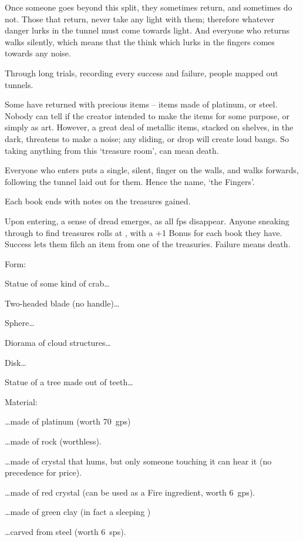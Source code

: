 \begin{multicols}{2}
\begin{exampletext}
  Once someone goes beyond this split, they sometimes return, and sometimes do not.
  Those that return, never take any light with them; therefore whatever danger lurks in the tunnel must come towards light.
  And everyone who returns walks silently, which means that the think which lurks in the fingers comes towards any noise.

  Through long trials, recording every success and failure, people mapped out tunnels.

  Some have returned with precious items -- items made of platinum, or steel.
  Nobody can tell if the creator intended to make the items for some purpose, or simply as art.
  However, a great deal of metallic items, stacked on shelves, in the dark, threatens to make a noise; any sliding, or drop will create loud bangs.
  So taking anything from this `treasure room', can mean death.

  Everyone who enters puts a single, silent, finger on the walls, and walks forwards, following the tunnel laid out for them.
  Hence the name, `the Fingers'.
\end{exampletext}

Each book ends with notes on the treasures gained.

Upon entering, a sense of dread emerges, as all \glspl{fp} disappear.
Anyone sneaking through to find treasures rolls  at \tn[12], with a +1 Bonus for each book they have.
Success lets them filch an item from one of the treasuries.
Failure means death.

Form:

\begin{dlist}
  \item
  Statue of some kind of crab\ldots
  \item
  Two-headed blade (no handle)\ldots
  \item
  Sphere\ldots
  \item
  Diorama of cloud structures\ldots
  \item
  Disk\ldots
  \item
  Statue of a tree made out of teeth\ldots
\end{dlist}

Material:

\begin{dlist}
  \item
  \ldots made of platinum (worth 70~\glspl{gp})
  \item
  \ldots made of rock (worthless).
  \item
  \ldots made of crystal that hums, but only someone touching it can hear it (no precedence for price).
  \item
  \ldots made of red crystal (can be used as a Fire \gls{ingredient}, worth 6~\glspl{gp}).
  \item
  \ldots made of green clay (in fact a sleeping \superWierdzi)
  \item
  \ldots carved from steel (worth 6~\glspl{sp}).
\end{dlist}

\end{multicols}

